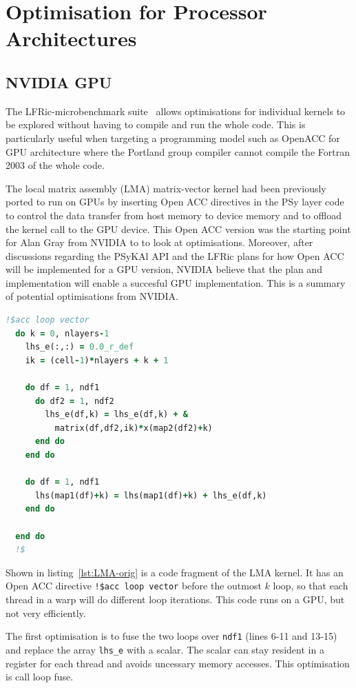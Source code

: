 \section{Optimisation for Processor Architectures
\label{sec:pa}}

\subsection{NVIDIA GPU}
The LFRic-microbenchmark suite~\cite{lfric-microbenchmarks} allows
optimisations for individual kernels to be explored without having to
compile and run the whole code. This is particularly useful when
targeting a programming model such as OpenACC for GPU architecture
where the Portland group compiler cannot compile the Fortran 2003 of
the whole code.

The local matrix assembly (LMA) matrix-vector kernel had been
previously ported to run on GPUs by inserting Open ACC directives in
the PSy layer code to control the data transfer from host memory to
device memory and to offload the kernel call to the GPU device. This
Open ACC version was the starting point for Alan Gray from NVIDIA to
to look at optimisations. Moreover, after discussions regarding 
the PSyKAl API and the LFRic plans for how Open ACC will be
implemented for a GPU version, NVIDIA believe that the plan and
implementation will enable a succesful GPU implementation.
This is a summary of potential optimisations from NVIDIA.

\begin{lstlisting}[language=Fortran,caption={Code fragment of original 
    kernel},label={lst:LMA-orig}]
  !$acc loop vector 
  do k = 0, nlayers-1
    lhs_e(:,:) = 0.0_r_def
    ik = (cell-1)*nlayers + k + 1

    do df = 1, ndf1
      do df2 = 1, ndf2
        lhs_e(df,k) = lhs_e(df,k) + & 
          matrix(df,df2,ik)*x(map2(df2)+k)
      end do
    end do

    do df = 1, ndf1
      lhs(map1(df)+k) = lhs(map1(df)+k) + lhs_e(df,k)
    end do

  end do 
  !$
\end{lstlisting}

Shown in listing~\ref{lst:LMA-orig} is a code fragment of the LMA
kernel. It has an Open ACC directive \verb+!$acc loop vector+ before the
outmost $k$ loop, so that each thread in a warp will do different loop
iterations. This code runs on a GPU, but not very efficiently. 

The first optimisation is to fuse the two loops over \verb+ndf1+
(lines 6-11 and 13-15) and replace the array \verb+lhs_e+ with a
scalar. The scalar can stay resident in a register for each thread and
avoids uncessary memory accesses. This optimisation is call loop
fuse. 

